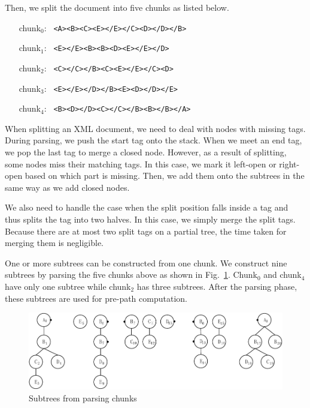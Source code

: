 Then, we split the document into five chunks as listed below.

\begin{itemize}
	\item[chunk$_0$:] \texttt{ <A><B><C><E></E></C><D></D></B>}
	\item[chunk$_1$:] \texttt{ <E></E><B><B><D><E></E></D>}
	\item[chunk$_2$:] \texttt{ <C></C></B><C><E></E></C><D>}
	\item[chunk$_3$:] \texttt{ <E></E></D></B><E><D></D></E>}
	\item[chunk$_4$:] \texttt{ <B><D></D><C></C></B><B></B></A>}
\end{itemize}

When splitting an XML document, we need to deal with nodes with missing tags.
During parsing, we push the start tag onto the stack. When we meet an
end tag, we pop the last tag to merge a closed node. However, as a result of splitting, 
some nodes miss their matching tags. In this case, we  
mark it left-open or right-open based on which part is missing. Then, we add them onto 
the subtrees in the same way as we add closed nodes.

We also need to handle the case when the split position falls inside a tag 
and thus splits the tag into two halves.
In this case, we simply merge the split tags. 
Because there are at most two split tags on a partial tree, 
the time taken for merging them is negligible. 

One or more subtrees can be constructed from one chunk.
We construct nine subtrees by parsing the five chunks above as shown in  Fig.~\ref{fig:partialtree-notfinished}.
Chunk$_0$ and chunk$_4$ have only one subtree while chunk$_2$ has three subtrees.
After the parsing phase, these subtrees are used for pre-path computation.

\begin{figure}[t]
	\centering\includegraphics[]{partialtree/figures/fromWord-6.pdf}
	\caption{Subtrees from parsing chunks}
	\label{fig:partialtree-notfinished}
\end{figure}



